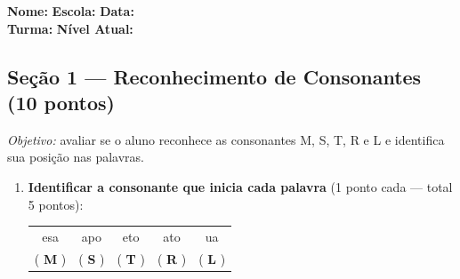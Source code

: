\begin{avaliacao}
\begin{center}
\end{center}

\vspace{0.5em}
\noindent\textbf{Nome:} \underline{\hspace{5cm}} \quad
\textbf{Escola:} \underline{\hspace{4cm}} \quad
\textbf{Data:} \underline{\hspace{2.5cm}}\\[0.5em]
\noindent\textbf{Turma:} \underline{\hspace{2cm}} \quad
\textbf{N\'{i}vel Atual:} \underline{\hspace{3cm}}

\subsection*{Seção 1 — Reconhecimento de Consonantes (10 pontos)}

\textit{Objetivo:} avaliar se o aluno reconhece as consonantes M, S, T, R e L
e identifica sua posição nas palavras.

\begin{enumerate}
  \item \textbf{Identificar a consonante que inicia cada palavra} (1 ponto cada — total 5 pontos):

  \begin{center}
  \begin{tabular}{ccccc}
    \underline{\hspace{0.8cm}}esa &
    \underline{\hspace{0.8cm}}apo &
    \underline{\hspace{0.8cm}}eto &
    \underline{\hspace{0.8cm}}ato &
    \underline{\hspace{0.8cm}}ua \\[0.3em]
    ( \textbf{M} ) &
    ( \textbf{S} ) &
    ( \textbf{T} ) &
    ( \textbf{R} ) &
    ( \textbf{L} ) \\
  \end{tabular}
  \end{center}


\end{enumerate}
\end{avaliacao}
